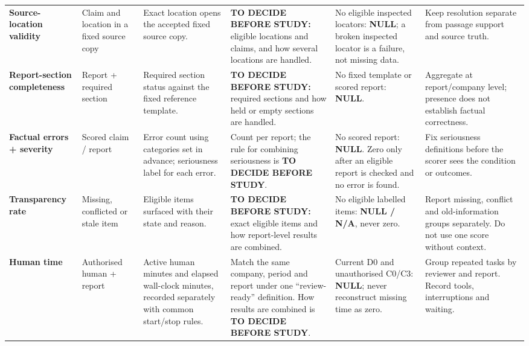 \begin{longtable}{@{}P{0.14\textwidth}P{0.10\textwidth}P{0.19\textwidth}P{0.195\textwidth}P{0.15\textwidth}P{0.175\textwidth}@{}}
    \addlinespace[1.5pt]
    \textbf{Source-location validity} &
    Claim and location in a fixed source copy &
    Exact location opens the accepted fixed source copy. &
    \textbf{TO DECIDE BEFORE STUDY:} eligible locations and claims, and how several locations are handled. &
    No eligible inspected locators: \textbf{NULL}; a broken inspected locator is a failure, not missing data. &
    Keep resolution separate from passage support and source truth. \\

    \addlinespace[1.5pt]
    \textbf{Report-section completeness} &
    Report + required section &
    Required section status against the fixed reference template. &
    \textbf{TO DECIDE BEFORE STUDY:} required sections and how held or empty sections are handled. &
    No fixed template or scored report: \textbf{NULL}. &
    Aggregate at report/company level; presence does not establish factual correctness. \\

    \addlinespace[1.5pt]
    \textbf{Factual errors + severity} &
    Scored claim / report &
    Error count using categories set in advance; seriousness label for each error. &
    Count per report; the rule for combining seriousness is \textbf{TO DECIDE BEFORE STUDY}. &
    No scored report: \textbf{NULL}. Zero only after an eligible report is checked and no error is found. &
    Fix seriousness definitions before the scorer sees the condition or outcomes. \\

    \addlinespace[1.5pt]
    \textbf{Transparency rate} &
    Missing, conflicted or stale item &
    Eligible items surfaced with their state and reason. &
    \textbf{TO DECIDE BEFORE STUDY:} exact eligible items and how report-level results are combined. &
    No eligible labelled items: \textbf{NULL / N/A}, never zero. &
    Report missing, conflict and old-information groups separately. Do not use one score without context. \\

    \addlinespace[1.5pt]
    \textbf{Human time} &
    Authorised human + report &
    Active human minutes and elapsed wall-clock minutes, recorded separately with common start/stop rules. &
    Match the same company, period and report under one ``review-ready'' definition. How results are combined is \textbf{TO DECIDE BEFORE STUDY}. &
    Current D0 and unauthorised C0/C3: \textbf{NULL}; never reconstruct missing time as zero. &
    Group repeated tasks by reviewer and report. Record tools, interruptions and waiting. \\


\end{longtable}

